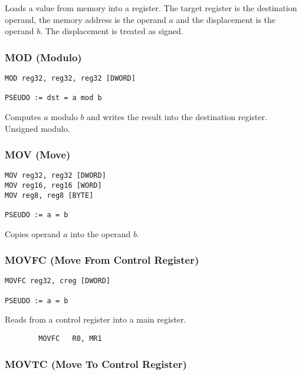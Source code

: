 Loads a value from memory into a register. The target register is the destination operand, the memory address is the operand $a$ and
the displacement is the operand $b$. The displacement is treated as signed.


\subsubsection{MOD (Modulo)}

\begin{verbatim}
MOD reg32, reg32, reg32 [DWORD]

PSEUDO := dst = a mod b
\end{verbatim}


Computes $a$ modulo $b$ and writes the result into the destination register. Unsigned modulo. 


\subsubsection{MOV (Move)}

\begin{verbatim}
MOV reg32, reg32 [DWORD]
MOV reg16, reg16 [WORD]
MOV reg8, reg8 [BYTE]

PSEUDO := a = b
\end{verbatim}


Copies operand $a$ into the operand $b$.

\subsubsection{MOVFC (Move From Control Register)}

\begin{verbatim}
MOVFC reg32, creg [DWORD]

PSEUDO := a = b
\end{verbatim}


Reads from a control register into a main register.


\begin{verbatim}
        MOVFC   R0, MR1
\end{verbatim}

\subsubsection{MOVTC (Move To Control Register)}


